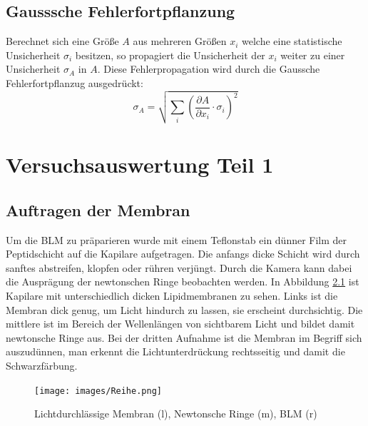 \documentclass{include/thesisclass3}
\newcommand{\cc}{\cdot}
\newcommand{\p}{\partial}
\begin{document}
\section{Gausssche Fehlerfortpflanzung}
Berechnet sich eine Größe $A$ aus mehreren Größen $x_i$ welche eine statistische Unsicherheit $\sigma_i$ besitzen, so propagiert die Unsicherheit der $x_i$ weiter zu einer Unsicherheit $\sigma_A$ in $A$. Diese Fehlerpropagation wird durch die Gaussche Fehlerfortpflanzug ausgedrückt:
\begin{equation}
\sigma_A = \sqrt{\sum_i \left( \frac{\p A}{\p x_i} \cc \sigma_i \right)^2 }
\label{gauss}
\end{equation}



\chapter{Versuchsauswertung Teil 1}
\section{Auftragen der Membran}
Um die BLM zu präparieren wurde mit einem Teflonstab ein dünner Film der Peptidschicht auf die Kapilare aufgetragen. Die anfangs dicke Schicht wird durch sanftes abstreifen, klopfen oder rühren verjüngt. Durch die Kamera kann dabei die Ausprägung der newtonschen Ringe beobachten werden. In Abbildung \ref{Reihe} ist Kapilare mit unterschiedlich dicken Lipidmembranen zu sehen. Links ist die Membran dick genug, um Licht hindurch zu lassen, sie erscheint durchsichtig. Die mittlere ist im Bereich der Wellenlängen von sichtbarem Licht und bildet damit newtonsche Ringe aus. Bei der dritten Aufnahme ist die Membran im Begriff sich auszudünnen, man erkennt die Lichtunterdrückung rechtsseitig und damit die Schwarzfärbung.
\begin{figure}[H]
	\begin{center}
		\texttt{[image: images/Reihe.png]}
		\caption{Lichtdurchlässige Membran (l), Newtonsche Ringe (m), BLM (r)}
		\label{Reihe}
	\end{center}
\end{figure}
\end{document}
